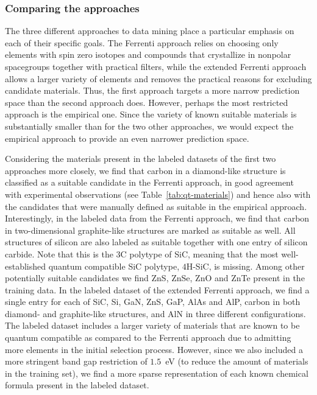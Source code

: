 \documentclass[superscriptaddress,unsortedaddress,
 amsmath,amssymb,
 aps,
]{revtex4-2}
\begin{document}
\subsubsection*{Comparing the approaches}
The three different approaches to data mining place a particular emphasis on each of their specific goals. The Ferrenti approach relies on choosing only elements with spin zero isotopes and compounds that crystallize in nonpolar spacegroups together with practical filters, while the extended Ferrenti approach allows a larger variety of elements and removes the practical reasons for excluding candidate materials. Thus, the first approach targets a more narrow prediction space than the second approach does. However, perhaps the most restricted approach is the empirical one. Since the variety of known suitable materials is substantially smaller than for the two other approaches, we would expect the empirical approach to provide an even narrower prediction space. %

Considering the materials present in the labeled datasets of the first two approaches more closely, we find that carbon in a diamond-like structure is classified as a suitable candidate in the Ferrenti approach, in good agreement with experimental observations (see Table~\ref{tab:qt-materials}) and hence also with the candidates that were manually defined as suitable in the empirical approach.   Interestingly, in the labeled data from the Ferrenti approach, we find that carbon in two-dimensional graphite-like structures are marked as suitable as well. All structures of silicon are also labeled as suitable together with one entry of silicon carbide. Note that this is the $3$C polytype of SiC, meaning that the most well-established quantum compatible SiC polytype, $4$H-SiC, is missing. 
Among other potentially suitable candidates we find ZnS, ZnSe, ZnO and ZnTe present in the training data.  
In the labeled dataset of the extended Ferrenti approach, we find a single entry for each of SiC, Si, GaN, ZnS, GaP, AlAs and AlP, carbon in both diamond- and graphite-like structures, and AlN in three different configurations. The labeled dataset includes a larger variety of materials that are known to be quantum compatible as compared to the Ferrenti approach due to admitting more elements in the initial selection process. However, since we also included a more stringent band gap restriction of $1.5$~eV (to reduce the amount of materials in the training set), we find a more sparse representation of each known chemical formula present in the labeled dataset. 
\end{document}
